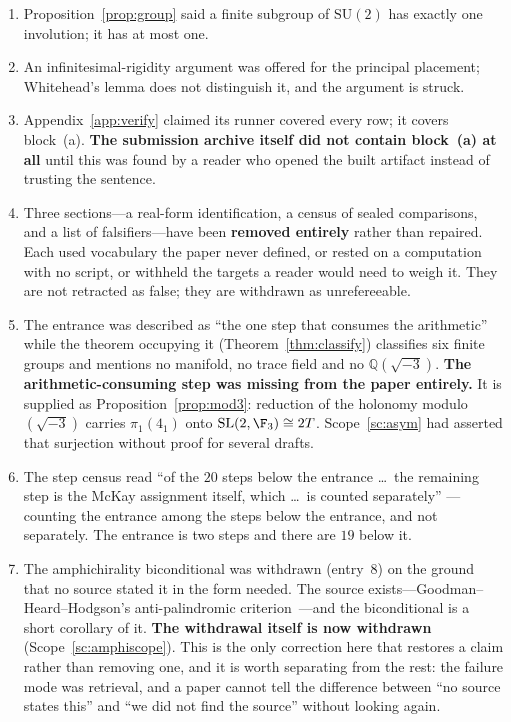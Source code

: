 \documentclass[11pt,reqno]{amsart}
\theoremstyle{plain}
\theoremstyle{definition}
\theoremstyle{remark}
\newcommand{\Q}{\mathbb{Q}}
\newcommand{\SL}{\mathrm{SL}}
\newcommand{\SU}{\mathrm{SU}}
\begin{document}
\begin{enumerate}[leftmargin=2.2em,itemsep=1pt]
  divisibility, which does not exclude the binary dihedral family.
\item Proposition~\ref{prop:group} said a finite subgroup of $\SU(2)$ has exactly one
  involution; it has at most one.
\item An infinitesimal-rigidity argument was offered for the principal placement;
  Whitehead's lemma does not distinguish it, and the argument is struck.
\item Appendix~\ref{app:verify} claimed its runner covered every row; it covers
  block~(a). \textbf{The submission archive itself did not contain block~(a) at all}
  until this was found by a reader who opened the built artifact instead of trusting the
  sentence.
\item Three sections---a real-form identification, a census of sealed comparisons, and a
  list of falsifiers---have been \textbf{removed entirely} rather than repaired. Each
  used vocabulary the paper never defined, or rested on a computation with no script, or
  withheld the targets a reader would need to weigh it. They are not retracted as false;
  they are withdrawn as unrefereeable.

\item The entrance was described as ``the one step that consumes the arithmetic'' while
  the theorem occupying it (Theorem~\ref{thm:classify}) classifies six finite groups and
  mentions no manifold, no trace field and no $\Q(\sqrt{-3})$. \textbf{The
  arithmetic-consuming step was missing from the paper entirely.} It is supplied as
  Proposition~\ref{prop:mod3}: reduction of the holonomy modulo $(\sqrt{-3})$ carries
  $\pi_1(4_1)$ onto $\SL(2,\F_3)\cong2T$. Scope~\ref{sc:asym} had asserted that
  surjection without proof for several drafts.

\item The step census read ``of the $20$ steps below the entrance \dots\ the remaining
  step is the McKay assignment itself, which \dots\ is counted separately'' --- counting
  the entrance among the steps below the entrance, and not separately. The entrance is
  two steps and there are $19$ below it.

\item The amphichirality biconditional was withdrawn (entry~8) on the ground that no
  source stated it in the form needed. The source exists---Goodman--Heard--Hodgson's
  anti-palindromic criterion~\cite{GHH}---and the biconditional is a short corollary of
  it. \textbf{The withdrawal itself is now withdrawn} (Scope~\ref{sc:amphiscope}). This
  is the only correction here that restores a claim rather than removing one, and it is
  worth separating from the rest: the failure mode was retrieval, and a paper cannot tell
  the difference between ``no source states this'' and ``we did not find the source''
  without looking again.


\end{enumerate}
\end{document}

